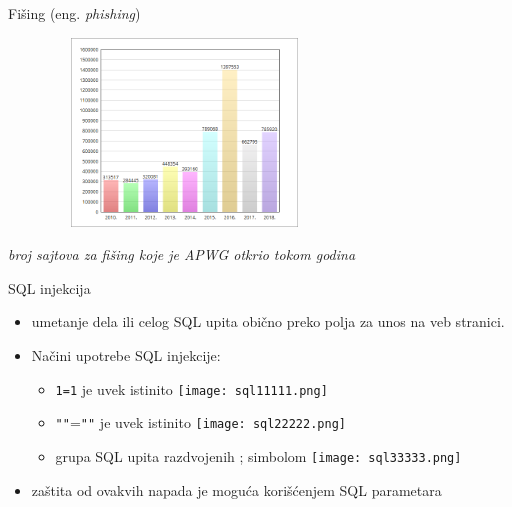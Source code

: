 \begin{frame}{Fišing (eng. \textit{phishing})}
        \begin{minipage}{\textwidth}
            \centering
            \vspace{0.3cm}
            \includegraphics[width=0.7\textwidth, height = 5cm]{images/phishing.png}
        \end{minipage}
        \begin{minipage}{\textwidth}
            \centering
            \textit{broj sajtova za fišing koje je APWG otkrio tokom godina}
        \end{minipage}
    \end{frame}

\begin{frame}{SQL injekcija}
        
            \begin{itemize}
                \item umetanje dela ili celog SQL upita obično preko polja za unos na veb stranici. 
                \item Načini upotrebe SQL injekcije:
                		\begin{itemize}
                		\item \texttt{1=1} je uvek istinito
                		        \texttt{[image: sql11111.png]}
                		\item \texttt{"}\texttt{"}=\texttt{"}\texttt{"} je uvek istinito
                		        \texttt{[image: sql22222.png]}                		        
                		\item grupa SQL upita razdvojenih ; simbolom
                		        \texttt{[image: sql33333.png]}
                		\end{itemize}
                	\item zaštita od ovakvih napada je moguća korišćenjem SQL parametara
            \end{itemize}
    \end{frame}


